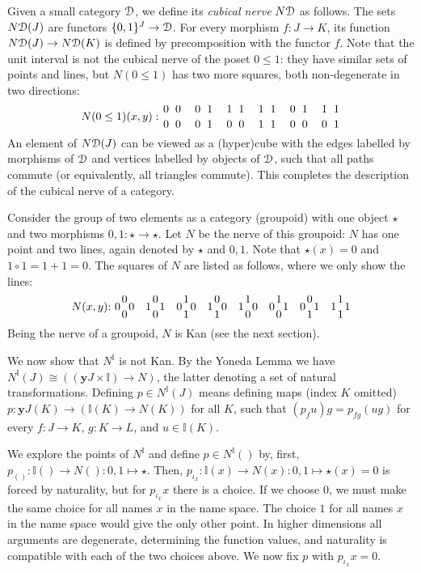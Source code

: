 \documentclass[a4paper,USenglish,draft]{lipics}
\newcommand{\yoneda}{\mathbf{y}}
\newcommand{\interval}{\mathbb{I}}
\newcommand{\DD}{{\cal D}}
\newcommand{\ND}{N\DD}
\newcommand{\set}[1]{\{#1\}}
\begin{document}
Given a small category $\DD$, we define its \emph{cubical nerve} $\ND$
as follows. The sets $\ND(J)$ are functors $\set{0,1}^J \to\DD$.  For
every morphism $f:J\to K$, its function $\ND(J)\to\ND(K)$ is defined
by precomposition with the functor $f$.  Note that the unit interval
is not the cubical nerve of the poset $0\leq1$: they have similar sets
of points and lines, but $N(0\leq1)$ has two more squares, both
non-degenerate in two directions:
\[
N(0\leq1)(x,y):{0 \atop 0} ~ {0 \atop 0}\quad{0 \atop 0} ~ {1 \atop 1}\quad{1 \atop 0} ~ {1 \atop 0}\quad{1 \atop 1} ~ {1 \atop 1}\quad{0 \atop 0} ~ {1 \atop 0}\quad{1 \atop 0} ~ {1 \atop 1}
\]
An element of $\ND(J)$ can be viewed as a (hyper)cube with the edges
labelled by morphisms of $\DD$ and vertices labelled by objects of
$\DD$, such that all paths commute (or equivalently, all triangles
commute).  This completes the description of the cubical nerve of a
category.

Consider the group of two elements as a category (groupoid) with one
object $\star$ and two morphisms $0,1:\star\to\star$.  Let $N$ be the
nerve of this groupoid: $N$ has one point and two lines, again denoted
by $\star$ and $0,1$.  Note that $\star(x) = 0$ and $1\circ 1 =
1+1=0$.  The squares of $N$ are listed as follows, where we only show
the lines:
\[
\def\ol{{1 \atop 0}}
\def\oo{{0 \atop 0}}
\def\lo{{0 \atop 1}}
\def\ll{{1 \atop 1}}
N(x,y){:}~
0\oo0 \quad 1\oo1 \quad 0\ll0 \quad 1\lo0 \quad 1\ol0 \quad 0\ol1 \quad 0\lo1 \quad 1\ll1
\]
Being the nerve of a groupoid, $N$ is Kan (see the next section).

We now show that $N^\interval$ is not Kan. By the Yoneda Lemma we have
$N^\interval(J)\cong ((\yoneda J \times \interval) \to N)$, the latter
denoting a set of natural transformations.  Defining $p\in
N^\interval(J)$ means defining maps (index $K$ omitted) $p :\yoneda J
(K) \to (\interval(K) \to N(K))$ for all $K$, such that $(p_f u) g =
p_{fg}(ug)$ for every $f:J\to K$, $g:K\to L$, and $u\in \interval(K)$.

We explore the points of $N^\interval$ and define $p\in N^\interval()$
by, first, $p_{()}:\interval()\to N(): 0,1 \mapsto\star$.  Then,
$p_{\iota_x}:\interval(x)\to N(x): 0,1 \mapsto\star(x)=0$ is forced by
naturality, but for $p_{\iota_x} x$ there is a choice. If we choose
$0$, we must make the same choice for all names $x$ in the name space.
The choice $1$ for all names $x$ in the name space would give the only
other point. In higher dimensions all arguments are degenerate,
determining the function values, and naturality is compatible with
each of the two choices above. We now fix $p$ with $p_{\iota_x} x =
0$.
\end{document}
